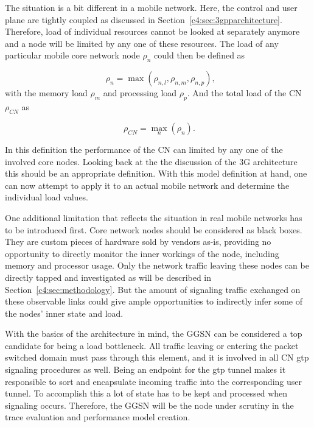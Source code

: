 The situation is a bit different in a mobile network. Here, the control and user plane are tightly coupled as discussed in Section~\ref{c4:sec:3gpparchitecture}.  Therefore, load of individual resources cannot be looked at separately anymore and a node will be limited by any one of these resources. The load of any particular mobile core network node $\rho_{n}$ could then be defined as

\begin{equation}
	\phantom{,}\rho_{n} = \max(\rho_{n,l}, \rho_{n,m}, \rho_{n,p})\text{,}
\end{equation}
%
with the memory load $\rho_{m}$ and processing load $\rho_{p}$. And the total load of the \gls{CN} $\rho_{CN}$ as

\begin{equation}
	\phantom{.}\rho_{CN} = \max_{n}(\rho_{n})\text{.}
\end{equation}

In this definition the performance of the \gls{CN} can limited by any one of the involved core nodes. Looking back at the the discussion of the \gls{3G} architecture this should be an appropriate definition. With this model definition at hand, one can now attempt to apply it to an actual mobile network and determine the individual load values. 

One additional limitation that reflects the situation in real mobile networks has to be introduced first. Core network nodes should be considered as black boxes. They are custom pieces of hardware sold by vendors as-is, providing no opportunity to directly monitor the inner workings of the node, including memory and processor usage. Only the network traffic leaving these nodes can be directly tapped and investigated as will be described in Section~\ref{c4:sec:methodology}. But the amount of signaling traffic exchanged on these observable links could give ample opportunities to indirectly infer some of the nodes' inner state and load.

With the basics of the architecture in mind, the \gls{GGSN} can be considered a top candidate for being a load bottleneck. All traffic leaving or entering the packet switched domain must pass through this element, and it is involved in all \gls{CN} \gls{gtp} signaling procedures as well. Being an endpoint for the \gls{gtp} tunnel makes it responsible to sort and encapsulate incoming traffic into the corresponding user tunnel. To accomplish this a lot of state has to be kept and processed when signaling occurs. Therefore, the \gls{GGSN} will be the node under scrutiny in the trace evaluation and performance model creation.

